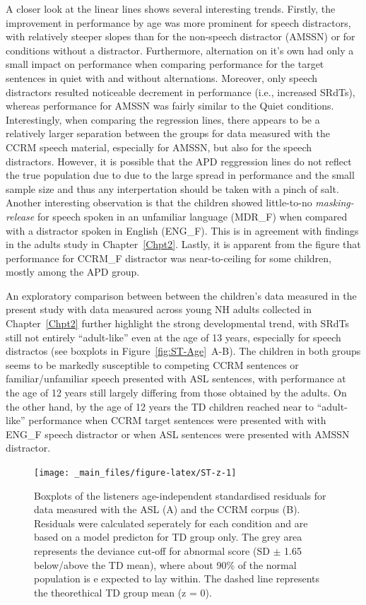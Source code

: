\documentclass[a4paper, twoside]{templates/ociamthesis}
\begin{document}
A closer look at the linear lines shows several interesting trends. Firstly, the improvement in performance by age was more prominent for speech distractors, with relatively steeper slopes than for the non-speech distractor (AMSSN) or for conditions without a distractor. Furthermore, alternation on it's own had only a small impact on performance when comparing performance for the target sentences in quiet with and without alternations. Moreover, only speech distractors resulted noticeable decrement in performance (i.e., increased SRdTs), whereas performance for AMSSN was fairly similar to the Quiet conditions. Interestingly, when comparing the regression lines, there appears to be a relatively larger separation between the groups for data measured with the CCRM speech material, especially for AMSSN, but also for the speech distractors. However, it is possible that the APD reggression lines do not reflect the true population due to due to the large spread in performance and the small sample size and thus any interpertation should be taken with a pinch of salt. Another interesting observation is that the children showed little-to-no \emph{masking-release} for speech spoken in an unfamiliar language (MDR\_F) when compared with a distractor spoken in English (ENG\_F). This is in agreement with findings in the adults study in Chapter~\ref{Chpt2}. Lastly, it is apparent from the figure that performance for CCRM\_F distractor was near-to-ceiling for some children, mostly among the APD group.

An exploratory comparison between between the children's data measured in the present study with data measured across young NH adults collected in Chapter~\ref{Chpt2} further highlight the strong developmental trend, with SRdTs still not entirely ``adult-like'' even at the age of 13 years, especially for speech distractos (see boxplots in Figure~\ref{fig:ST-Age}~A-B). The children in both groups seems to be markedly susceptible to competing CCRM sentences or familiar/unfamiliar speech presented with ASL sentences, with performance at the age of 12 years still largely differing from those obtained by the adults. On the other hand, by the age of 12 years the TD children reached near to ``adult-like'' performance when CCRM target sentences were presented with with ENG\_F speech distractor or when ASL sentences were presented with AMSSN distractor.

\begin{figure}

{\centering \texttt{[image: \_main\_files/figure-latex/ST-z-1]} 

}

\caption{Boxplots of the listeners age-independent standardised residuals for data measured with the ASL (A) and the CCRM corpus (B). Residuals were calculated seperately for each condition and are based on a model predicton for TD group only. The grey area represents the deviance cut-off for abnormal score (SD $\pm$ 1.65 below/above the TD mean), where about 90\% of the normal population is e expected to lay within. The dashed line represents the theorethical TD group mean (z = 0).}\label{fig:ST-z}
\end{figure}
\end{document}
